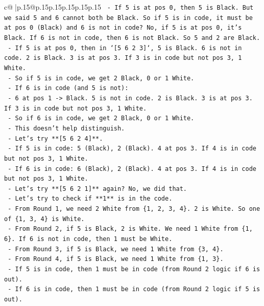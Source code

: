 \documentclass{article}
\begin{document}
{\begin{supertabular}{c@{$\;$}|p{.15\linewidth}@{}p{.15\linewidth}p{.15\linewidth}p{.15\linewidth}p{.15\linewidth}p{.15\linewidth}}
{{{\texttt{                    {-} If 5 is at pos 0, then 5 is Black. But we said 5 and 6 cannot both be Black. So if 5 is in code, it must be at pos 0 (Black) and 6 is not in code? No, if 5 is at pos 0, it's Black. If 6 is not in code, then 6 is not Black. So 5 and 2 are Black.} \\
\texttt{                    {-} If 5 is at pos 0, then in `{[}5 6 2 3{]}`, 5 is Black. 6 is not in code. 2 is Black. 3 is at pos 3. If 3 is in code but not pos 3, 1 White.} \\
\texttt{                    {-} So if 5 is in code, we get 2 Black, 0 or 1 White.} \\
\texttt{                {-} If 6 is in code (and 5 is not):} \\
\texttt{                    {-} 6 at pos 1 {-}> Black. 5 is not in code. 2 is Black. 3 is at pos 3. If 3 is in code but not pos 3, 1 White.} \\
\texttt{                    {-} So if 6 is in code, we get 2 Black, 0 or 1 White.} \\
\texttt{            {-} This doesn't help distinguish.} \\
\texttt{            {-} Let's try **{[}5 6 2 4{]}**.} \\
\texttt{                {-} If 5 is in code: 5 (Black), 2 (Black). 4 at pos 3. If 4 is in code but not pos 3, 1 White.} \\
\texttt{                {-} If 6 is in code: 6 (Black), 2 (Black). 4 at pos 3. If 4 is in code but not pos 3, 1 White.} \\
\texttt{            {-} Let's try **{[}5 6 2 1{]}** again? No, we did that.} \\
\texttt{            {-} Let's try to check if **1** is in the code.} \\
\texttt{            {-} From Round 1, we need 2 White from \{1, 2, 3, 4\}. 2 is White. So one of \{1, 3, 4\} is White.} \\
\texttt{            {-} From Round 2, if 5 is Black, 2 is White. We need 1 White from \{1, 6\}. If 6 is not in code, then 1 must be White.} \\
\texttt{            {-} From Round 3, if 5 is Black, we need 1 White from \{3, 4\}.} \\
\texttt{            {-} From Round 4, if 5 is Black, we need 1 White from \{1, 3\}.} \\
\texttt{            {-} If 5 is in code, then 1 must be in code (from Round 2 logic if 6 is out).} \\
\texttt{            {-} If 6 is in code, then 1 must be in code (from Round 2 logic if 5 is out).} \\
}}}
\end{supertabular}}
\end{document}
